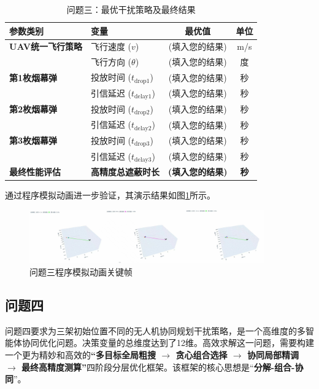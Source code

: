 \documentclass[12pt]{article}
\begin{document}
\begin{CJK}{UTF8}{gbsn}
		\begin{table}[H]
			\centering
			\caption{问题三：最优干扰策略及最终结果}
			\label{tab:results_q3}
			\begin{tabular}{@{}llcc@{}}
				\toprule
				参数类别           & 变量                & 最优值      & 单位 \\ \midrule
				\textbf{UAV统一飞行策略} & 飞行速度 ($v$)        & (填入您的结果) & m/s  \\
				& 飞行方向 ($\theta$)     & (填入您的结果) & 度   \\ \midrule
				\textbf{第1枚烟幕弹} & 投放时间 ($t_{\text{drop1}}$) & (填入您的结果) & 秒   \\
				& 引信延迟 ($t_{\text{delay1}}$) & (填入您的结果) & 秒   \\ \midrule
				\textbf{第2枚烟幕弹} & 投放时间 ($t_{\text{drop2}}$) & (填入您的结果) & 秒   \\
				& 引信延迟 ($t_{\text{delay2}}$) & (填入您的结果) & 秒   \\ \midrule
				\textbf{第3枚烟幕弹} & 投放时间 ($t_{\text{drop3}}$) & (填入您的结果) & 秒   \\
				& 引信延迟 ($t_{\text{delay3}}$) & (填入您的结果) & 秒   \\ \midrule
				\textbf{最终性能评估} & \textbf{高精度总遮蔽时长} & \textbf{(填入您的结果)} & \textbf{秒}   \\ \bottomrule
			\end{tabular}
		\end{table}
		
		通过程序模拟动画进一步验证，其演示结果如图\ref{fig:simulation_q3}所示。
		
		\begin{figure}[H]
			\centering
			\includegraphics[width=0.9\textwidth]{pic/sim3.jpg}
			\caption{问题三程序模拟动画关键帧}
			\label{fig:simulation_q3}
		\end{figure}
		
		\subsection{问题四}
		
		
		问题四要求为三架初始位置不同的无人机协同规划干扰策略，是一个高维度的多智能体协同优化问题。决策变量的总维度达到了12维。高效求解这一问题，需要构建一个更为精妙和高效的\textbf{“多目标全局粗搜 $\rightarrow$ 贪心组合选择 $\rightarrow$ 协同局部精调 $\rightarrow$ 最终高精度测算”}四阶段分层优化框架。该框架的核心思想是“\textbf{分解-组合-协同}”。
		

\end{CJK}
\end{document}
